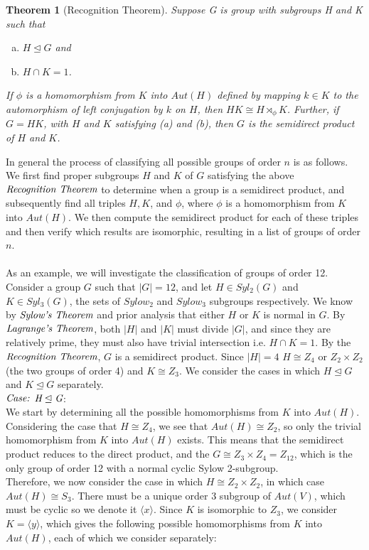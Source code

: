 \documentclass[11pt]{article}
\newtheorem{theorem}{Theorem}[section]
\newcommand{\ns}{\mathrel{\unlhd}}
\begin{document}
\begin{theorem}[Recognition Theorem]
Suppose G is group with subgroups H and K such that 
\begin{enumerate}[(a)]
\item $H \ns G$ and
\item $H \cap K = 1$.
\end{enumerate}
If $\phi$ is a homomorphism from $K$ into $Aut(H)$ defined by mapping $k \in K$ to the automorphism of left conjugation by $k$ on $H$, then $HK \cong H\rtimes_{\phi} K$. Further, if $G = HK$, with $H$ and $K$ satisfying (a) and (b), then $G$ is the semidirect product of $H$ and $K$.
\end{theorem}
In general the process of classifying all possible groups of order $n$ is as follows. We first find proper subgroups $H$ and $K$ of $G$ satisfying the above $\emph{Recognition Theorem}$ to determine when a group is a semidirect product, and subsequently find all triples $H, K$, and $\phi$, where $\phi$ is a homomorphism from $K$ into $Aut(H)$. We then compute the semidirect product for each of these triples and then verify which results are isomorphic, resulting in a list of groups of order $n$.
\\
\\
As an example, we will investigate the classification of groups of order 12.
\\
\indent
Consider a group $G$ such that $|G| = 12$, and let $H \in Syl_2(G)$ and $K \in Syl_3(G)$, the sets of $Sylow_2$ and $Sylow_3$ subgroups respectively. We know by $\emph{Sylow's Theorem}$ and prior analysis that either $H$ or $K$ is normal in $G$. By $\emph{Lagrange's Theorem}$, both $|H|$ and $|K|$ must divide $|G|$, and since they are relatively prime, they must also have trivial intersection i.e. $H \cap K = 1$.  By the $\emph{Recognition Theorem}$, $G$ is a semidirect product. Since $|H| = 4$ $H \cong Z_4$ or $Z_2 \times Z_2$ (the two groups of order 4) and $K \cong Z_3$. We consider the cases in which $H \ns G$ and $K \ns G$ separately. 
\\
\newline
$\emph{Case:}$ $\emph{H} \ns \emph{G} $: \\
\indent We start by determining all the possible homomorphisms from $K$ into $Aut(H)$. Considering the case that $H \cong Z_4$, we see that $Aut(H) \cong Z_2$, so only the trivial homomorphism from $K$ into $Aut(H)$ exists. This means that the semidirect product reduces to the direct product, and the $G \cong Z_3 \times Z_4 = Z_{12}$, which is the only group of order 12 with a normal cyclic Sylow 2-subgroup.
\\
\indent
Therefore, we now consider the case in which $H \cong Z_2 \times Z_2$, in which case $Aut(H) \cong S_3$. There must be a unique order 3 subgroup of $Aut(V)$, which must be cyclic so we denote it $\langle x \rangle$. Since $K$ is isomorphic to $Z_3$, we consider $K = \langle y \rangle$, which gives the following possible homomorphisms from $K$ into $Aut(H)$, each of which we consider separately:
\end{document}
